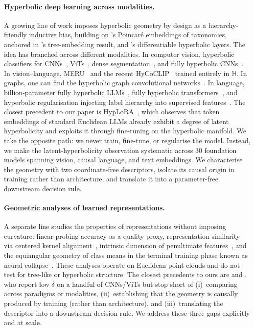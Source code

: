 \documentclass{article}
\begin{document}
\paragraph{Hyperbolic deep learning across modalities.} A growing line of work imposes hyperbolic geometry by design as a hierarchy-friendly inductive bias, building on \citet{nickel2017poincare}'s Poincar\'{e} embeddings of taxonomies, anchored in \citet{sarkar2011low}'s tree-embedding result, and \citet{ganea2018hyperbolic}'s differentiable hyperbolic layers. The idea has branched across different modalities. In computer vision, hyperbolic classifiers for CNNs~\citep{Khrulkov_2020_CVPR}, ViTs~\citep{ermolov2022hyperbolic}, dense segmentation~\citep{atigh2022hyperbolic}, and fully hyperbolic CNNs~\citep{bdeir2024fully}. In vision--language, MERU~\citep{desai2023meru} and the recent HyCoCLIP~\citep{pal2025compositional} trained entirely in $\mathbb{H}$. In graphs, one can find the hyperbolic graph convolutional networks~\citep{chami2019hyperbolic}. In language, billion-parameter fully hyperbolic LLMs~\citep{he2026helm}, fully hyperbolic transformers~\citep{chen2022fully}, and hyperbolic regularisation injecting label hierarchy into supervised features~\citep{sinha2024learning}. The closest precedent to our paper is HypLoRA~\citep{yang2025hyperbolic}, which observes that token embeddings of standard Euclidean LLMs already exhibit a degree of latent hyperbolicity and exploits it through fine-tuning on the hyperbolic manifold. We take the opposite path: we never train, fine-tune, or regularise the model. Instead, we make the latent-hyperbolicity observation systematic across 30 foundation models spanning vision, causal language, and text embeddings. We characterise the geometry with two coordinate-free descriptors, isolate its causal origin in training rather than architecture, and translate it into a parameter-free downstream decision rule.

\paragraph{Geometric analyses of learned representations.} A separate line studies the properties of representations without imposing curvature: linear probing accuracy as a quality proxy, representation similarity via centered kernel alignment~\citep{kornblith2019cka}, intrinsic dimension of penultimate features~\citep{ansuini2019intrinsic, pope2021intrinsic}, and the equiangular geometry of class means in the terminal training phase known as neural collapse~\citep{papyan2020prevalence}. These analyses operate on Euclidean point clouds and do not test for tree-like or hyperbolic structure. The closest precedents to ours are \citet{Khrulkov_2020_CVPR} and \citet{bdeir2024fully}, who report low $\delta$ on a handful of CNNs/ViTs but stop short of (i)~comparing across paradigms or modalities, (ii)~establishing that the geometry is causally produced by training (rather than architecture), and (iii)~translating the descriptor into a downstream decision rule. We address these three gaps explicitly and at scale.
\end{document}
